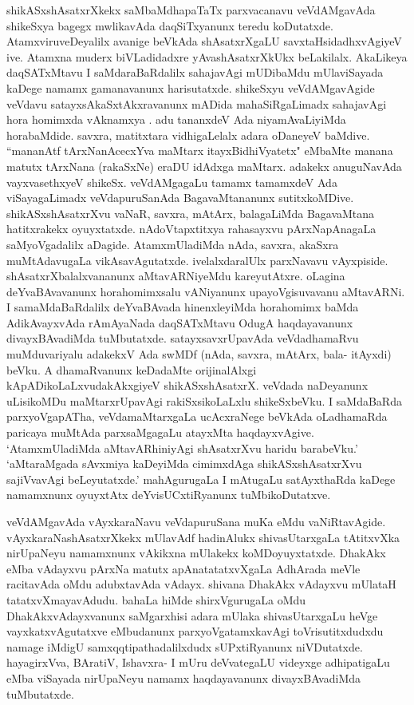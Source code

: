 shikASxshAsatxrXkekx  saMbaMdhapaTaTx parxvacanavu veVdAMgavAda shikeSxya bagegx mwlikavAda daqSiTxyanunx teredu koDutatxde. AtamxviruveDeyalilx avanige beVkAda shAsatxrXgaLU savxtaHsidadhxvAgiyeV ive. Atamxna muderx biVLadidadxre yAvashAsatxrXkUkx beLakilalx. AkaLikeya daqSATxMtavu I saMdaraBaRdalilx sahajavAgi mUDibaMdu mUlaviSayada kaDege namamx gamanavanunx harisutatxde. shikeSxyu veVdAMgavAgide veVdavu satayxsAkaSxtAkxravanunx mADida mahaSiRgaLimadx sahajavAgi hora homimxda vAknamxya . adu tananxdeV Ada niyamAvaLiyiMda horabaMdide. savxra, matitxtara vidhigaLelalx adara oDaneyeV baMdive. ``mananAtf tArxNanAcecxYva maMtarx itayxBidhiVyatetx" eMbaMte manana matutx tArxNana (rakaSxNe) eraDU idAdxga maMtarx. adakekx anuguNavAda vayxvasethxyeV shikeSx. veVdAMgagaLu tamamx  tamamxdeV Ada viSayagaLimadx veVdapuruSanAda BagavaMtananunx sutitxkoMDive. shikASxshAsatxrXvu vaNaR, savxra, mAtArx, balagaLiMda BagavaMtana hatitxrakekx oyuyxtatxde. nAdoVtapxtitxya rahasayxvu pArxNapAnagaLa saMyoVgadalilx aDagide. AtamxmUladiMda nAda, savxra, akaSxra muMtAdavugaLa vikAsavAgutatxde. ivelalxdaralUlx parxNavavu vAyxpiside. shAsatxrXbalalxvananunx aMtavARNiyeMdu kareyutAtxre. oLagina deYvaBAvavanunx horahomimxsalu vANiyanunx upayoVgisuvavanu aMtavARNi. I samaMdaBaRdalilx deYvaBAvada hinenxleyiMda horahomimx baMda AdikAvayxvAda rAmAyaNada daqSATxMtavu OdugA haqdayavanunx divayxBAvadiMda tuMbutatxde. satayxsavxrUpavAda veVdadhamaRvu muMduvariyalu adakekxV Ada swMDf (nAda, savxra, mAtArx, bala- itAyxdi) beVku. A dhamaRvanunx keDadaMte orijinalAlxgi kApADikoLaLxvudakAkxgiyeV shikASxshAsatxrX. veVdada naDeyanunx uLisikoMDu maMtarxrUpavAgi rakiSxsikoLaLxlu shikeSxbeVku. I saMdaBaRda parxyoVgapATha, veVdamaMtarxgaLa ucAcxraNege beVkAda oLadhamaRda paricaya muMtAda parxsaMgagaLu atayxMta haqdayxvAgive. `AtamxmUladiMda aMtavARhiniyAgi shAsatxrXvu haridu barabeVku.' `aMtaraMgada sAvxmiya kaDeyiMda cimimxdAga shikASxshAsatxrXvu sajiVvavAgi beLeyutatxde.' mahAgurugaLa I mAtugaLu satAyxthaRda kaDege namamxnunx oyuyxtAtx deYvisUCxtiRyanunx tuMbikoDutatxve.

veVdAMgavAda vAyxkaraNavu veVdapuruSana muKa eMdu vaNiRtavAgide. vAyxkaraNashAsatxrXkekx mUlavAdf hadinAlukx shivasUtarxgaLa tAtitxvXka nirUpaNeyu namamxnunx vAkikxna mUlakekx koMDoyuyxtatxde. DhakAkx eMba vAdayxvu pArxNa matutx apAnatatatxvXgaLa AdhArada meVle racitavAda oMdu adubxtavAda vAdayx. shivana DhakAkx vAdayxvu mUlataH tatatxvXmayavAdudu. bahaLa hiMde shirxVgurugaLa oMdu DhakAkxvAdayxvanunx saMgarxhisi adara mUlaka shivasUtarxgaLu heVge vayxkatxvAgutatxve eMbudanunx parxyoVgatamxkavAgi toVrisutitxdudxdu namage  iMdigU samxqqtipathadalilxdudx sUPxtiRyanunx niVDutatxde. hayagirxVva, BAratiV, Ishavxra- I mUru deVvategaLU videyxge adhipatigaLu eMba viSayada nirUpaNeyu namamx haqdayavanunx divayxBAvadiMda tuMbutatxde.

